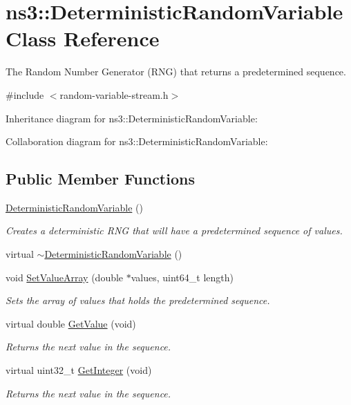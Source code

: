 \hypertarget{classns3_1_1DeterministicRandomVariable}{}\section{ns3\+:\+:Deterministic\+Random\+Variable Class Reference}
\label{classns3_1_1DeterministicRandomVariable}


The Random Number Generator (R\+NG) that returns a predetermined sequence.  




{\ttfamily \#include $<$random-\/variable-\/stream.\+h$>$}



Inheritance diagram for ns3\+:\+:Deterministic\+Random\+Variable\+:


Collaboration diagram for ns3\+:\+:Deterministic\+Random\+Variable\+:
\subsection*{Public Member Functions}
\begin{DoxyCompactItemize}
\item 
\hyperlink{classns3_1_1DeterministicRandomVariable_ad0c45b02bd5d923e605d9165992798c8}{Deterministic\+Random\+Variable} ()
\begin{DoxyCompactList}\small\item\em Creates a deterministic R\+NG that will have a predetermined sequence of values. \end{DoxyCompactList}\item 
virtual \hyperlink{classns3_1_1DeterministicRandomVariable_a91364f3a6eb8ee4ca44217e5039fbede}{$\sim$\+Deterministic\+Random\+Variable} ()
\item 
void \hyperlink{classns3_1_1DeterministicRandomVariable_af705c5489a2cb8dd541b1f460c344804}{Set\+Value\+Array} (double $\ast$values, uint64\+\_\+t length)
\begin{DoxyCompactList}\small\item\em Sets the array of values that holds the predetermined sequence. \end{DoxyCompactList}\item 
virtual double \hyperlink{classns3_1_1DeterministicRandomVariable_aad908286981f00bc2f335c34c41b6f55}{Get\+Value} (void)
\begin{DoxyCompactList}\small\item\em Returns the next value in the sequence. \end{DoxyCompactList}\item 
virtual uint32\+\_\+t \hyperlink{classns3_1_1DeterministicRandomVariable_ae6a856a94af0f8ee7e6713806b6f9ef9}{Get\+Integer} (void)
\begin{DoxyCompactList}\small\item\em Returns the next value in the sequence. \end{DoxyCompactList}\end{DoxyCompactItemize}
